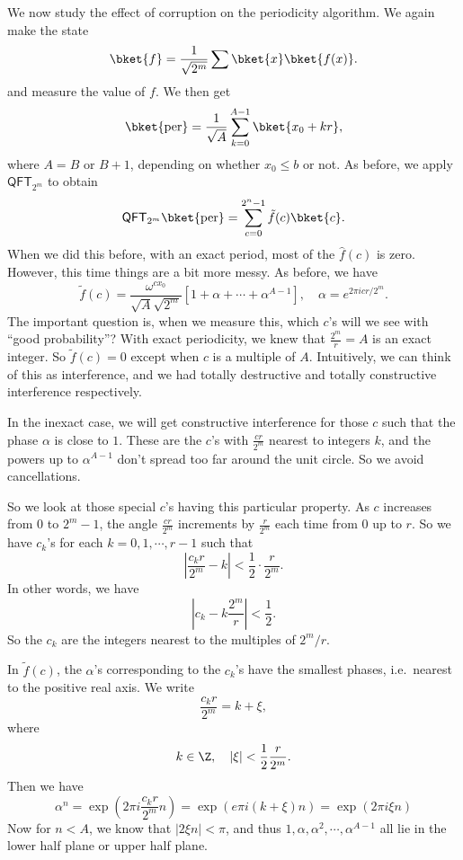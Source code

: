 \documentclass[a4paper]{article}
\newcommand{\qQFT}{\mathsf{QFT}}
\begin{document}
We now study the effect of corruption on the periodicity algorithm. We again make the state
\[
  \bket{f} = \frac{1}{\sqrt{2^m}} \sum \bket{x} \bket{f(x)}.
\]
and measure the value of $f$. We then get
\[
  \bket{\mathrm{per}} = \frac{1}{\sqrt{A}} \sum_{k = 0}^{A - 1} \bket{x_0 + kr},
\]
where $A = B$ or $B + 1$, depending on whether $x_0 \leq b$ or not. As before, we apply $\qQFT_{2^m}$ to obtain
\[
  \qQFT_{2^m}\bket{\mathrm{per}} = \sum_{c = 0}^{2^n - 1} \tilde{f}(c) \bket{c}.
\]
When we did this before, with an exact period, most of the $\hat{f}(c)$ is zero. However, this time things are a bit more messy. As before, we have
\[
  \tilde{f}(c) = \frac{\omega^{c x_0}}{\sqrt{A}\sqrt{2^m}} [1 + \alpha + \cdots + \alpha^{A - 1}],\quad \alpha = e^{2\pi i cr/2^m}.
\]
The important question is, when we measure this, which $c$'s will we see with ``good probability''? With exact periodicity, we knew that $\frac{2^m}{r} = A$ is an exact integer. So $\tilde{f}(c) = 0$ except when $c$ is a multiple of $A$. Intuitively, we can think of this as interference, and we had totally destructive and totally constructive interference respectively.

In the inexact case, we will get constructive interference for those $c$ such that the phase $\alpha$ is close to $1$. These are the $c$'s with $\frac{cr}{2^m}$ nearest to integers $k$, and the powers up to $\alpha^{A - 1}$ don't spread too far around the unit circle. So we avoid cancellations.

So we look at those special $c$'s having this particular property. As $c$ increases from $0$ to $2^m - 1$, the angle $\frac{cr}{2^m}$ increments by $\frac{r}{2^m}$ each time from $0$ up to $r$. So we have $c_k$'s for each $k = 0, 1, \cdots, r - 1$ such that
\[
  \left|\frac{c_k r}{2^m} - k\right| < \frac{1}{2} \cdot \frac{r}{2^m}.
\]
In other words, we have
\[
  \left|c_k - k\frac{2^m}{r}\right| < \frac{1}{2}.
\]
So the $c_k$ are the integers nearest to the multiples of $2^m/r$.

In $\tilde{f}(c)$, the $\alpha$'s corresponding to the $c_k$'s have the smallest phases, i.e.\ nearest to the positive real axis. We write
\[
  \frac{c_k r}{2^m} = k + \xi,
\]
where
\[
  k \in \Z,\quad |\xi| < \frac{1}{2} \frac{r}{2^m}.
\]
Then we have
\[
  \alpha^n = \exp\left(2\pi i \frac{c_k r}{2^m}n\right) = \exp\left(e\pi i(k + \xi)n\right) = \exp(2 \pi i \xi n)
\]
Now for $n < A$, we know that $|2 \xi n| < \pi$, and thus $1, \alpha, \alpha^2, \cdots, \alpha^{A - 1}$ all lie in the lower half plane or upper half plane.
\end{document}
